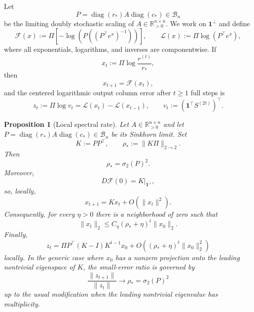 \documentclass[11pt]{article}
\numberwithin{equation}{section}
\theoremstyle{plain}
\newtheorem{proposition}[theorem]{Proposition}
\theoremstyle{definition}
\theoremstyle{remark}
\newcommand{\R}{\mathbb{R}}
\newcommand{\ones}{\mathbf{1}}
\newcommand{\cB}{\mathcal{B}}
\newcommand{\diag}{\operatorname{diag}}
\begin{document}
Let
\[
        P=\diag(r_*)A\diag(c_*)\in\cB_n
\]
be the limiting doubly stochastic scaling of $A\in\R_{>0}^{n\times n}$. We work on
$\ones^\perp$ and define
\begin{equation}\label{eq:F-L-defs}
        \mathcal F(x)
        :=
        \Pi\left[-\log\left(P\left((P^\top e^x)^{-1}\right)\right)\right],
        \qquad
        \mathcal L(x)
        :=
        \Pi\log(P^\top e^x),
\end{equation}
where all exponentials, logarithms, and inverses are componentwise. If
\[
        x_t:=\Pi\log\frac{r^{(t)}}{r_*},
\]
then
\begin{equation}\label{eq:exact-log-coordinate-recursion}
        x_{t+1}=\mathcal F(x_t),
\end{equation}
and the centered logarithmic output column error after $t\ge1$ full steps is
\begin{equation}\label{eq:exact-log-column-error}
        z_t:=\Pi\log v_t
        =
        \mathcal L(x_t)-\mathcal L(x_{t-1}),
        \qquad
        v_t:=(\ones^\top S^{(2t)})^\top.
\end{equation}

\begin{proposition}[Local spectral rate]\label{thm:local-spectral-sinkhorn}
Let $A\in\R_{>0}^{n\times n}$ and let $P=\diag(r_*)A\diag(c_*)\in\cB_n$ be its Sinkhorn limit. Set
\[
        K:=PP^\top,
        \qquad
        \rho_*:=\|K\Pi\|_{2\to2}.
\]
Then
\begin{equation}\label{eq:rho-star-sigma}
        \rho_* = \sigma_2(P)^2 .
\end{equation}
Moreover,
\begin{equation}\label{eq:F-linearization-sharp}
        D\mathcal F(0)=K|_{\ones^\perp},
\end{equation}
so, locally,
\begin{equation}\label{eq:x-linear-asymp}
        x_{t+1}=Kx_t+O(\|x_t\|^2).
\end{equation}
Consequently, for every $\eta>0$ there is a neighborhood of zero such that
\begin{equation}\label{eq:rho-eta-local}
        \|x_t\|_2
        \le
        C_\eta(\rho_*+\eta)^t\|x_0\|_2 .
\end{equation}
Finally,
\begin{equation}\label{eq:linearized-column-error-sharp}
        z_t
        =
        \Pi P^\top(K-I)K^{t-1}x_0
        +O\!\left((\rho_*+\eta)^t\|x_0\|_2^2\right)
\end{equation}
locally. In the generic case where $x_0$ has a nonzero projection onto the leading nontrivial eigenspace of $K$, the small-error ratio is governed by
\[
        \frac{\|z_{t+1}\|}{\|z_t\|}\longrightarrow \rho_* = \sigma_2(P)^2
\]
up to the usual modification when the leading nontrivial eigenvalue has multiplicity.
\end{proposition}
\end{document}
